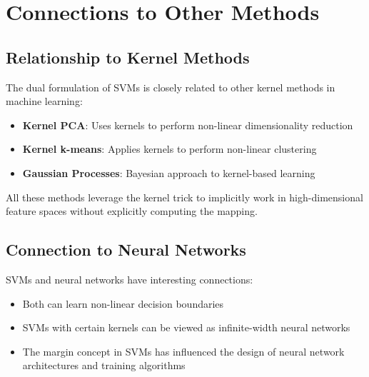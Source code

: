 \documentclass{article}
\begin{document}

\section{Connections to Other Methods}

\subsection{Relationship to Kernel Methods}
The dual formulation of SVMs is closely related to other kernel methods in machine learning:

\begin{itemize}
    \item \textbf{Kernel PCA}: Uses kernels to perform non-linear dimensionality reduction
    \item \textbf{Kernel k-means}: Applies kernels to perform non-linear clustering
    \item \textbf{Gaussian Processes}: Bayesian approach to kernel-based learning
\end{itemize}

All these methods leverage the kernel trick to implicitly work in high-dimensional feature spaces without explicitly computing the mapping.

\subsection{Connection to Neural Networks}
SVMs and neural networks have interesting connections:

\begin{itemize}
    \item Both can learn non-linear decision boundaries
    \item SVMs with certain kernels can be viewed as infinite-width neural networks
    \item The margin concept in SVMs has influenced the design of neural network architectures and training algorithms
\end{itemize}
\end{document}

